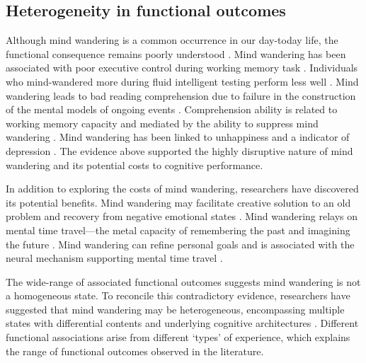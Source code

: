 \subsection{Heterogeneity in functional outcomes}


Although mind wandering is a common occurrence in our day-today life, the functional consequence remains poorly understood \cite{SmallwoodFrontiers2013, Mooneyham2013}. Mind wandering has been associated with poor executive control during working memory task \cite{McVayJOEP2009}. Individuals who mind-wandered more during fluid intelligent testing perform less well \cite{MrazekJoEP2012}. Mind wandering leads to bad reading comprehension due to failure in the construction of the mental models of ongoing events \cite{Smallwood2008}. Comprehension ability is related to working memory capacity and mediated by the ability to suppress mind wandering \cite{McVayReading2012, Unsworth2013}. Mind wandering has been linked to unhappiness \cite{Killingsworth2010} and a indicator of depression \cite{Smallwood2007}. The evidence above supported the highly disruptive nature of mind wandering and its potential costs to cognitive performance.

In addition to exploring the costs of mind wandering, researchers have discovered its potential benefits. Mind wandering may facilitate creative solution to an old problem \cite{Baird2012, Smeekens2016} and recovery from negative emotional states \cite{RubyPlos2013, PoerioFrontiers2016}. Mind wandering relays on mental time travel---the metal capacity of remembering the past and imagining the future \cite{Stawarczyk2015}.  Mind wandering can refine personal goals \cite{Medea2016} and is associated with the neural mechanism supporting mental time travel \cite{DArgembeau2006,DArgembeau2015}. 

The wide-range of associated functional outcomes suggests mind wandering is not a homogeneous state. To reconcile this contradictory evidence, researchers have suggested that mind wandering may be heterogeneous, encompassing multiple states with differential contents and underlying cognitive architectures \cite{SmallwoodFrontiers2013}. Different functional associations arise from different `types' of experience, which explains the range of functional outcomes observed in the literature.


